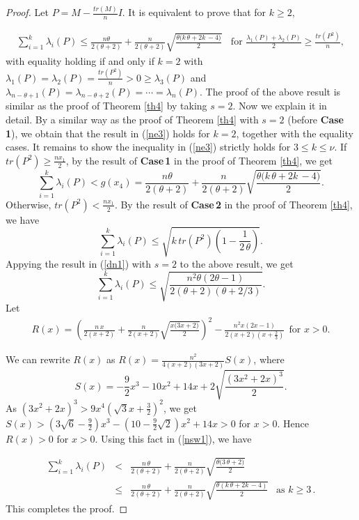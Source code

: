 \documentclass[12pt]{article}
\begin{document}
 \begin{proof}
 Let $P=M-\frac{tr(M)}{n}I$. It is equivalent to prove that for $k\geq 2$,

 \begin{eqnarray}
 \sum_{i=1}^{k}\lambda_i(P)\leq\frac{n\theta}{2(\theta+2)}+\frac{n}{2(\theta+2)}\sqrt{\frac{\theta\big(k\,\theta+2k\,-4\big)}{2}}~~~~\mbox{for  }\frac{\lambda_1(P)+\lambda_2(P)}{2}\geq \frac{tr(P^2)}{n},\label{ne3}
 \end{eqnarray}
 with equality holding if and only if $k=2$ with $\lambda_1(P)=\lambda_2(P)=\frac{tr(P^2)}{n}>0\geq \lambda_3(P)$ and
 $\lambda_{n-\theta+1}(P)=\lambda_{n-\theta+2}(P)=\cdots=\lambda_n(P)$.
 The proof of the above result is similar as the proof of Theorem \ref{th4} by taking $s=2$. Now we explain it in detail. By a similar way as the proof of Theorem \ref{th4} with $s=2$ (before {\bf Case\,1}), we obtain that the result in (\ref{ne3}) holds for $k=2$, together with the equality cases. It remains to show the inequality in (\ref{ne3}) strictly holds
for $3\leq k\leq \nu$. If $tr(P^2)\geq \frac{nx_1}{2}$, by the result of {\bf Case\,1} in the proof of Theorem \ref{th4}, we get
 $$\sum_{i=1}^{k}\lambda_i(P)<g(x_4)=\frac{n\theta}{2(\theta+2)}+\frac{n}{2(\theta+2)} \sqrt{\frac{\theta\big(k\,\theta+2k\,-4\big)}{2}}.$$
Otherwise, $tr(P^2)<\frac{nx_1}{2}$. By the result of {\bf Case\,2} in the proof of Theorem \ref{th4}, we have
\begin{equation*}
 \sum_{i=1}^{k}\lambda_i(P)\leq \sqrt{k\,tr(P^2)\left(1-\frac{1}{2\,\theta}\right)}.
\end{equation*}
Appying the result in (\ref{dn1}) with $s=2$ to the above result, we get
\begin{equation}
 \sum_{i=1}^{k}\lambda_i(P)\leq \sqrt{\frac{n^2\theta(2\theta-1)}{2(\theta+2)(\theta+2/3)}}.\label{nsw1}
\end{equation}
 Let
 \begin{eqnarray*}
 R(x)=\left(\frac{n\,x}{2(x+2)}+\frac{n}{2(x+2)}\sqrt{\frac{x\big(3x+2\big)}{2}}\right)^2
   -\frac{n^2x(2x-1)}{2(x+2)(x+\frac{2}{3})}~~\mbox{for }x>0.\label{lnn1}
 \end{eqnarray*}

 \noindent
 We can rewrite $R(x)$ as $R(x)=\frac{n^2}{4(x+2)(3x+2)}S(x)$, where
$$ S(x)=-\frac{9}{2}x^3 - 10x^2 + 14x + 2\sqrt{\frac{(3x^2 +2x)^3}{2}}.$$
  As $(3x^2+2x)^3>9x^4(\sqrt{3}x+\frac{3}{2})^2$, we get $S(x)>(3\sqrt{6}-\frac{9}{2})x^3-(10-\frac{9}{2}\sqrt{2})x^2+14x>0$ for $x>0$. Hence $R(x)>0$ for $x>0$.
Using this fact in (\ref{nsw1}), we have

  \begin{eqnarray}
 \sum_{i=1}^{k}\lambda_i(P) &<&\frac{n\,\theta}{2(\theta+2)}+\frac{n}{2(\theta+2)}\sqrt{\frac{\theta\big(3\,\theta+2\big)}{2}}\nonumber\\[2mm]
     &\leq & \frac{n\,\theta}{2(\theta+2)}+\frac{n}{2(\theta+2)}\sqrt{\frac{\theta(k\,\theta+2k\,-4)}{2}}~~\mbox{  as } k\geq 3\,.\nonumber
 \end{eqnarray}
 This completes the proof.
 \end{proof}
\end{document}
